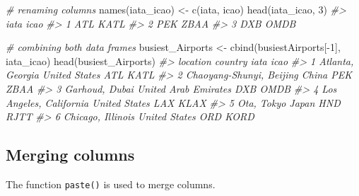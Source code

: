 \documentclass[
]{book}
\newenvironment{Shaded}{\begin{snugshade}}{\end{snugshade}}
\newcommand{\CommentTok}[1]{\textcolor[rgb]{0.56,0.35,0.01}{\textit{#1}}}
\newcommand{\DecValTok}[1]{\textcolor[rgb]{0.00,0.00,0.81}{#1}}
\newcommand{\FunctionTok}[1]{\textcolor[rgb]{0.00,0.00,0.00}{#1}}
\newcommand{\NormalTok}[1]{#1}
\newcommand{\OtherTok}[1]{\textcolor[rgb]{0.56,0.35,0.01}{#1}}
\newcommand{\SpecialCharTok}[1]{\textcolor[rgb]{0.00,0.00,0.00}{#1}}
\newcommand{\StringTok}[1]{\textcolor[rgb]{0.31,0.60,0.02}{#1}}
\begin{document}
\begin{Shaded}
\begin{Highlighting}[]
\CommentTok{\# renaming columns}
\FunctionTok{names}\NormalTok{(iata\_icao) }\OtherTok{\textless{}{-}} \FunctionTok{c}\NormalTok{(}\StringTok{\textquotesingle{}iata\textquotesingle{}}\NormalTok{, }\StringTok{\textquotesingle{}icao\textquotesingle{}}\NormalTok{)}
\FunctionTok{head}\NormalTok{(iata\_icao, }\DecValTok{3}\NormalTok{)}
\CommentTok{\#\textgreater{}   iata icao}
\CommentTok{\#\textgreater{} 1  ATL KATL}
\CommentTok{\#\textgreater{} 2  PEK ZBAA}
\CommentTok{\#\textgreater{} 3  DXB OMDB}

\CommentTok{\# combining both data frames}
\NormalTok{busiest\_Airports }\OtherTok{\textless{}{-}} \FunctionTok{cbind}\NormalTok{(busiestAirports[}\SpecialCharTok{{-}}\DecValTok{1}\NormalTok{], iata\_icao)}
\FunctionTok{head}\NormalTok{(busiest\_Airports)}
\CommentTok{\#\textgreater{}                   location              country iata icao}
\CommentTok{\#\textgreater{} 1         Atlanta, Georgia        United States  ATL KATL}
\CommentTok{\#\textgreater{} 2 Chaoyang{-}Shunyi, Beijing                China  PEK ZBAA}
\CommentTok{\#\textgreater{} 3           Garhoud, Dubai United Arab Emirates  DXB OMDB}
\CommentTok{\#\textgreater{} 4  Los Angeles, California        United States  LAX KLAX}
\CommentTok{\#\textgreater{} 5               Ota, Tokyo                Japan  HND RJTT}
\CommentTok{\#\textgreater{} 6        Chicago, Illinois        United States  ORD KORD}
\end{Highlighting}
\end{Shaded}

\hypertarget{merging-columns}{%
\subsection{Merging columns}\label{merging-columns}}

The function \texttt{paste()} is used to merge columns.
\end{document}
